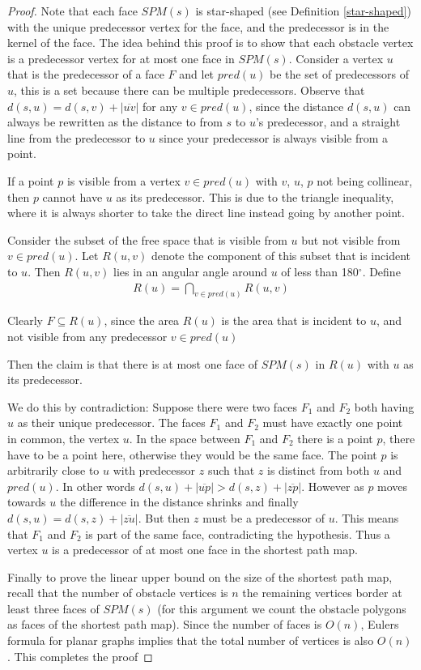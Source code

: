 \begin{proof}
	Note that each face $SPM(s)$ is star-shaped (see Definition
	\ref{star-shaped})
	with the unique predecessor vertex for the face, and the predecessor is in
	the kernel of the face.
	The idea behind this proof is to show that each obstacle vertex is a
	predecessor vertex for at most one face in $SPM(s)$.
	Consider a vertex $u$ that is the predecessor of a face $F$ and let
	$pred(u)$ be the set of predecessors of $u$, this is a set because there can
	be multiple predecessors. Observe that $d(s,u)=d(s,v)+|\overline{uv}|$ for
	any $v\in pred(u)$, since the distance $d(s,u)$ can always be rewritten as
	the distance to from $s$ to $u$'s predecessor, and a straight line from the
	predecessor to $u$ since your predecessor is always visible from a point.

	If a point $p$ is visible from a vertex $v \in pred(u)$ with $v$, $u$, $p$ 
    not being collinear, then $p$ cannot have $u$ as its predecessor. This is 
    due to the triangle inequality, where it is always shorter to take the direct 
    line instead going by another point.


	Consider the subset of the free space that is visible from $u$
	but not visible from $v\in pred(u)$. Let $R(u,v)$ denote the component of
	this subset that is incident to $u$. Then $R(u,v)$ lies in an
	angular angle around $u$ of less than 180$^\circ$. Define
	\begin{align}
		R(u) =  \bigcap_{v\in pred(u)} R(u,v)
	\end{align}

	Clearly $F \subseteq R(u)$, since the area $R(u)$ is the area that is
	incident to $u$, and not visible from any predecessor $v\in pred(u)$ 
	
	Then the claim is that there is at most one face of
	$SPM(s)$ in $R(u)$ with $u$ as its predecessor. 
	
	We do this by contradiction: 
	Suppose there were two faces
	$F_1$ and $F_2$ both having $u$ as their unique predecessor. The faces $F_1$
	and $F_2$ must have exactly one point in common, the vertex $u$. In the space
	between $F_1$ and $F_2$ there is a point $p$, there have to be a point here,
	otherwise they would be the same face. The point $p$ is arbitrarily close to $u$ with
	predecessor $z$ such that $z$ is distinct from both $u$ and $pred(u)$. In
	other words $d(s,u)+|\overline{up}|>d(s,z)+|\overline{zp}|$. However as $p$
	moves towards $u$ the difference in the distance shrinks and finally
	$d(s,u) = d(s,z)+|\overline{zu}|$. But then $z$ must be a predecessor of
	$u$. This means that $F_1$ and $F_2$ is part of the same face, contradicting
	the hypothesis. Thus a vertex $u$ is a predecessor of at most one face in
	the shortest path map.

	Finally to prove the linear upper bound on the size of the shortest path
	map, recall that the number of obstacle vertices is $n$ the remaining
	vertices border at least three faces of $SPM(s)$ (for this argument we count
	the obstacle polygons as faces of the shortest path map). Since the number
	of faces is $O(n)$, Eulers formula for planar graphs implies that the total
	number of vertices is also $O(n)$. This completes the proof
\end{proof}
